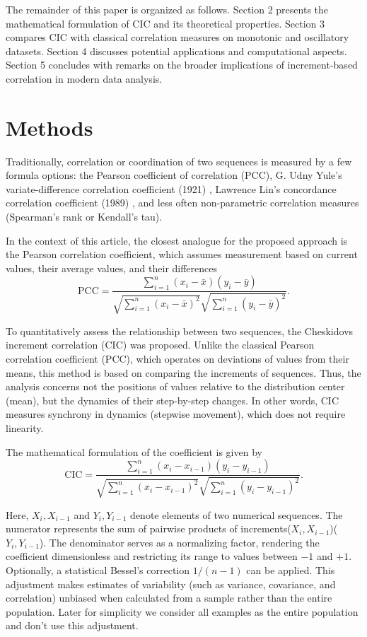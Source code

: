 \documentclass[aos]{imsart}
\newcommand{\cic}{\text{CIC}}
\newcommand{\pcc}{\text{PCC}}
\begin{document}
The remainder of this paper is organized as follows. Section 2 presents the mathematical formulation of $\cic$ and its theoretical properties. Section 3 compares $\cic$ with classical correlation measures on monotonic and oscillatory datasets. Section 4 discusses potential applications and computational aspects. Section 5 concludes with remarks on the broader implications of increment-based correlation in modern data analysis.

\section{Methods}

Traditionally, correlation or coordination of two sequences is measured by a few formula options: the Pearson coefficient of correlation ($\pcc$), G. Udny Yule’s variate-difference correlation coefficient (1921) \cite{r1}, Lawrence Lin’s concordance correlation coefficient (1989) \cite{r2}, and less often non-parametric correlation measures (Spearman’s rank or Kendall’s tau).

In the context of this article, the closest analogue for the proposed approach is the Pearson correlation coefficient, which assumes measurement based on current values, their average values, and their differences
\begin{equation}
\text{$\pcc$} = \frac{\sum_{i=1}^n (x_i - \bar{x})(y_i - \bar{y})}{\sqrt{\sum_{i=1}^n (x_i - \bar{x})^2}\sqrt{\sum_{i=1}^n (y_i - \bar{y})^2}}.
\end{equation}

To quantitatively assess the relationship between two sequences, the Cheskidovs increment correlation ($\cic$) was proposed. Unlike the classical Pearson correlation coefficient ($\pcc$), which operates on deviations of values from their means, this method is based on comparing the increments of sequences. Thus, the analysis concerns not the positions of values relative to the distribution center (mean), but the dynamics of their step-by-step changes. In other words, $\cic$ measures synchrony in dynamics (stepwise movement), which does not require linearity.

The mathematical formulation of the coefficient is given by
\begin{equation}
\text{$\cic$} = \frac{\sum_{i=1}^n (x_i - x_{i-1})(y_i - y_{i-1})}{\sqrt{\sum_{i=1}^n (x_i - x_{i-1})^2} \sqrt{\sum_{i=1}^n (y_i - y_{i-1})^2}}.
\end{equation}

Here, $X_i, X_{i-1}$ and $Y_i, Y_{i-1}$ denote elements of two numerical sequences. The numerator represents the sum of pairwise products of increments($X_i, X_{i-1}$)($Y_i, Y_{i-1}$).  The denominator serves as a normalizing factor, rendering the coefficient dimensionless and restricting its range to values between $-1$ and $+1$. Optionally, a statistical Bessel’s correction $1/(n-1)$ can be applied. This adjustment makes estimates of variability (such as variance, covariance, and correlation) unbiased when calculated from a sample rather than the entire population. Later for simplicity we consider all examples as the entire population and don’t use this adjustment.
\end{document}
